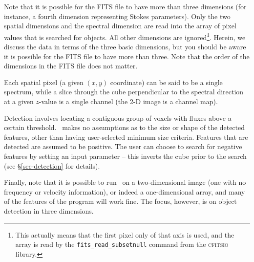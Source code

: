 Note that it is possible for the FITS file to have more than three
dimensions (for instance, a fourth dimension representing Stokes
parameters). Only the two spatial dimensions and the spectral
dimension are read into the array of pixel values that is searched for
objects. All other dimensions are ignored\footnote{This actually means
that the first pixel only of that axis is used, and the array is read
by the \texttt{fits\_read\_subsetnull} command from the
\textsc{cfitsio} library.}. Herein, we discuss the data in terms of
the three basic dimensions, but you should be aware it is possible for
the FITS file to have more than three. Note that the order of the
dimensions in the FITS file does not matter.

Each spatial pixel (a given $(x,y)$ coordinate) can be said to be a
single spectrum, while a slice through the cube perpendicular to the
spectral direction at a given $z$-value is a single channel (the 2-D
image is a channel map).

Detection involves locating a contiguous group of voxels with fluxes
above a certain threshold. \duchamp\ makes no assumptions as to the
size or shape of the detected features, other than having
user-selected minimum size criteria. Features that are detected are
assumed to be positive. The user can choose to search for negative
features by setting an input parameter -- this inverts the cube prior
to the search (see \S\ref{sec-detection} for details).

Finally, note that it is possible to run \duchamp\ on a
two-dimensional image (\ie one with no frequency or velocity
information), or indeed a one-dimensional array, and many of the
features of the program will work fine. The focus, however, is on
object detection in three dimensions.

